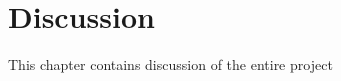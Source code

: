 \chapter{Discussion}\label{ch:discussion}
This chapter contains discussion of the entire project 

\section{}